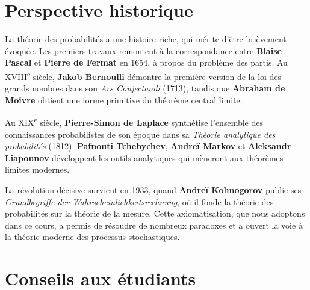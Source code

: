 \section*{Perspective historique}

La th\'eorie des probabilit\'es a une histoire riche, qui m\'erite d'\^etre bri\`evement
\'evoqu\'ee. Les premiers travaux remontent \`a la correspondance entre \textbf{Blaise Pascal}
et \textbf{Pierre de Fermat} en 1654, \`a propos du probl\`eme des partis. Au
XVIII\textsuperscript{e} si\`ecle, \textbf{Jakob Bernoulli} d\'emontre la premi\`ere
version de la loi des grands nombres dans son \textit{Ars Conjectandi} (1713), tandis que
\textbf{Abraham de Moivre} obtient une forme primitive du th\'eor\`eme central limite.

\medskip

Au XIX\textsuperscript{e} si\`ecle, \textbf{Pierre-Simon de Laplace} synth\'etise
l'ensemble des connaissances probabilistes de son \'epoque dans sa \textit{Th\'eorie
analytique des probabilit\'es} (1812). \textbf{Pafnouti Tchebychev}, \textbf{Andre\"i Markov}
et \textbf{Aleksandr Liapounov} d\'eveloppent les outils analytiques qui m\`eneront aux
th\'eor\`emes limites modernes.

\medskip

La r\'evolution d\'ecisive survient en 1933, quand \textbf{Andre\"i Kolmogorov} publie ses
\textit{Grundbegriffe der Wahrscheinlichkeitsrechnung}, o\`u il fonde la th\'eorie des
probabilit\'es sur la th\'eorie de la mesure. Cette axiomatisation, que nous adoptons dans
ce cours, a permis de r\'esoudre de nombreux paradoxes et a ouvert la voie \`a la th\'eorie
moderne des processus stochastiques.

\section*{Conseils aux \'etudiants}

